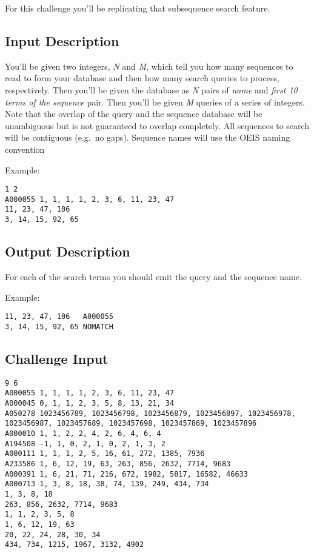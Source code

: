 For this challenge you'll be replicating that subsequence search
feature.

\subsection{Input Description}\label{input-description-20}

You'll be given two integers, \emph{N} and \emph{M}, which tell you how
many sequences to read to form your database and then how many search
queries to process, respectively. Then you'll be given the database as
\emph{N} pairs of \emph{name} and \emph{first 10 terms of the sequence}
pair. Then you'll be given \emph{M} queries of a series of integers.
Note that the overlap of the query and the sequence database will be
unambiguous but is not guaranteed to overlap completely. All sequences
to search will be contiguous (e.g.~no gaps). Sequence names will use the
OEIS naming convention

Example:

\begin{verbatim}
1 2
A000055 1, 1, 1, 1, 2, 3, 6, 11, 23, 47
11, 23, 47, 106
3, 14, 15, 92, 65
\end{verbatim}

\subsection{Output Description}\label{output-description-21}

For each of the search terms you should emit the query and the sequence
name.

Example:

\begin{verbatim}
11, 23, 47, 106   A000055
3, 14, 15, 92, 65 NOMATCH
\end{verbatim}

\subsection{Challenge Input}\label{challenge-input-22}

\begin{verbatim}
9 6
A000055 1, 1, 1, 1, 2, 3, 6, 11, 23, 47
A000045 0, 1, 1, 2, 3, 5, 8, 13, 21, 34
A050278 1023456789, 1023456798, 1023456879, 1023456897, 1023456978, 1023456987, 1023457689, 1023457698, 1023457869, 1023457896
A000010 1, 1, 2, 2, 4, 2, 6, 4, 6, 4
A194508 -1, 1, 0, 2, 1, 0, 2, 1, 3, 2
A000111 1, 1, 1, 2, 5, 16, 61, 272, 1385, 7936
A233586 1, 6, 12, 19, 63, 263, 856, 2632, 7714, 9683
A000391 1, 6, 21, 71, 216, 672, 1982, 5817, 16582, 46633
A000713 1, 3, 8, 18, 38, 74, 139, 249, 434, 734
1, 3, 8, 18
263, 856, 2632, 7714, 9683
1, 1, 2, 3, 5, 8
1, 6, 12, 19, 63
20, 22, 24, 28, 30, 34
434, 734, 1215, 1967, 3132, 4902
\end{verbatim}

